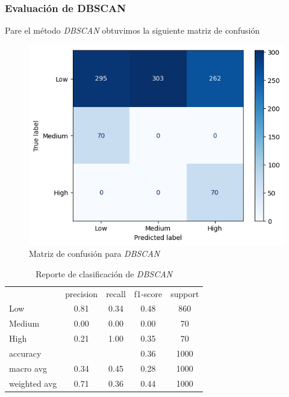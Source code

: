 \subsubsection{Evaluación de DBSCAN}

Pare el método \textit{DBSCAN} obtuvimos la siguiente matriz de confusión

\begin{figure}[H]
    \centering
    \includegraphics[scale = 0.6]{Enrique/Imagenes/matriz_confusion_DBSCAN.png}
    \caption{Matriz de confusión para \textit{DBSCAN}}
\end{figure}

\begin{table}[H]
    \centering
    \begin{tabular}{l c c c c}
        & precision & recall & f1-score & support \\
        Low    & 0.81 & 0.34 & 0.48 & 860 \\
        Medium & 0.00 & 0.00 & 0.00 & 70 \\
        High   & 0.21 & 1.00 & 0.35 & 70 \\
        accuracy & & & 0.36 & 1000 \\
        macro avg & 0.34 & 0.45 & 0.28 & 1000 \\
        weighted avg & 0.71 & 0.36 & 0.44 & 1000
    \end{tabular}
    \caption{Reporte de clasificación de \textit{DBSCAN} }
\end{table}
               





